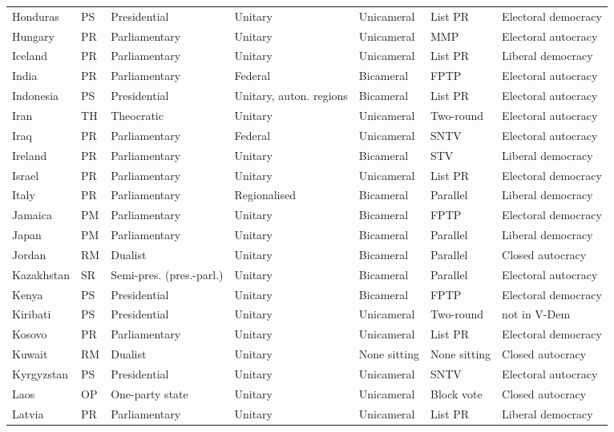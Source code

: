 \documentclass[11pt,a4paper]{article}
\begin{document}
{\begin{longtable}{p{2.9cm}lp{2.9cm}p{2.4cm}lp{1.9cm}p{2.0cm}}
Honduras & PS & Presidential & Unitary & Unicameral & List PR & Electoral democracy\\
Hungary & PR & Parliamentary & Unitary & Unicameral & MMP & Electoral autocracy\\
Iceland & PR & Parliamentary & Unitary & Unicameral & List PR & Liberal democracy\\
India & PR & Parliamentary & Federal & Bicameral & FPTP & Electoral autocracy\\
Indonesia & PS & Presidential & Unitary, auton. regions & Bicameral & List PR & Electoral autocracy\\
Iran & TH & Theocratic & Unitary & Unicameral & Two-round & Electoral autocracy\\
Iraq & PR & Parliamentary & Federal & Unicameral & SNTV & Electoral autocracy\\
Ireland & PR & Parliamentary & Unitary & Bicameral & STV & Liberal democracy\\
Israel & PR & Parliamentary & Unitary & Unicameral & List PR & Electoral democracy\\
Italy & PR & Parliamentary & Regionalised & Bicameral & Parallel & Liberal democracy\\
Jamaica & PM & Parliamentary & Unitary & Bicameral & FPTP & Electoral democracy\\
Japan & PM & Parliamentary & Unitary & Bicameral & Parallel & Liberal democracy\\
Jordan & RM & Dualist & Unitary & Bicameral & Parallel & Closed autocracy\\
Kazakhstan & SR & Semi-pres. (pres.-parl.) & Unitary & Bicameral & Parallel & Electoral autocracy\\
Kenya & PS & Presidential & Unitary & Bicameral & FPTP & Electoral democracy\\
Kiribati & PS & Presidential & Unitary & Unicameral & Two-round & not in V-Dem\\
Kosovo & PR & Parliamentary & Unitary & Unicameral & List PR & Electoral democracy\\
Kuwait & RM & Dualist & Unitary & None sitting & None sitting & Closed autocracy\\
Kyrgyzstan & PS & Presidential & Unitary & Unicameral & SNTV & Electoral autocracy\\
Laos & OP & One-party state & Unitary & Unicameral & Block vote & Closed autocracy\\
Latvia & PR & Parliamentary & Unitary & Unicameral & List PR & Liberal democracy\\

\end{longtable}}
\end{document}

